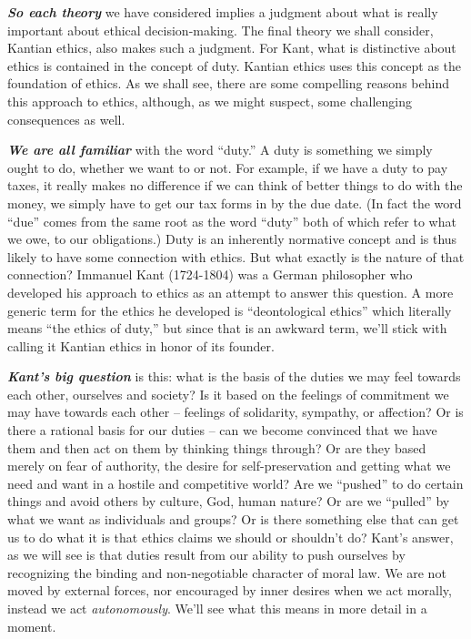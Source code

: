 \documentclass[
  12pt, openany]{book}
\begin{document}
\textbf{\emph{So each theory}} we have considered implies a judgment about what is really important about ethical decision-making. The final theory we shall consider, Kantian ethics, also makes such a judgment. For Kant, what is distinctive about ethics is contained in the concept of duty. Kantian ethics uses this concept as the foundation of ethics. As we shall see, there are some compelling reasons behind this approach to ethics, although, as we might suspect, some challenging consequences as well.

\textbf{\emph{We are all familiar}} with the word ``duty.'' A duty is something we simply ought to do, whether we want to or not. For example, if we have a duty to pay taxes, it really makes no difference if we can think of better things to do with the money, we simply have to get our tax forms in by the due date. (In fact the word ``due'' comes from the same root as the word ``duty'' both of which refer to what we owe, to our obligations.) Duty is an inherently normative concept and is thus likely to have some connection with ethics. But what exactly is the nature of that connection? Immanuel Kant (1724-1804) was a German philosopher who developed his approach to ethics as an attempt to answer this question. A more generic term for the ethics he developed is ``deontological ethics'' which literally means ``the ethics of duty,'' but since that is an awkward term, we'll stick with calling it Kantian ethics in honor of its founder.

\textbf{\emph{Kant's big question}} is this: what is the basis of the duties we may feel towards each other, ourselves and society? Is it based on the feelings of commitment we may have towards each other -- feelings of solidarity, sympathy, or affection? Or is there a rational basis for our duties -- can we become convinced that we have them and then act on them by thinking things through? Or are they based merely on fear of authority, the desire for self-preservation and getting what we need and want in a hostile and competitive world? Are we ``pushed'' to do certain things and avoid others by culture, God, human nature? Or are we ``pulled'' by what we want as individuals and groups? Or is there something else that can get us to do what it is that ethics claims we should or shouldn't do? Kant's answer, as we will see is that duties result from our ability to push ourselves by recognizing the binding and non-negotiable character of moral law. We are not moved by external forces, nor encouraged by inner desires when we act morally, instead we act \emph{autonomously}. We'll see what this means in more detail in a moment.
\end{document}
